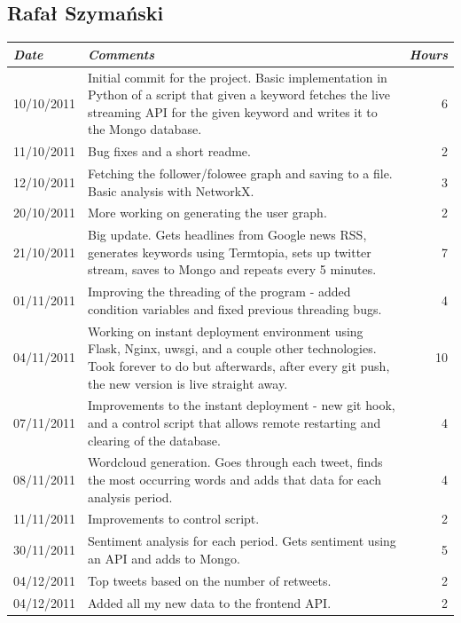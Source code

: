 \documentclass{report}
\begin{document}
		  \subsection{Rafał Szymański}
		    \begin{tabular}{l | p{10cm} r}
		     \emph{\large Date} & \emph{\large Comments} & \emph{\large Hours}\\
		     \hline
		     10/10/2011 & Initial commit for the project. Basic implementation in Python of a script that given a keyword  fetches the live streaming API for the given keyword and writes it to the Mongo database. & 6\\
	       11/10/2011 & Bug fixes and a short readme. & 2\\
	       12/10/2011 & Fetching the follower/folowee graph and saving to a file. Basic analysis with NetworkX. & 3\\
	       20/10/2011 & More working on generating the user graph. & 2\\
	       21/10/2011 & Big update. Gets headlines from Google news RSS, generates keywords using Termtopia, sets up twitter stream, saves to Mongo and repeats every 5 minutes. & 7\\
	       01/11/2011 & Improving the threading of the program - added condition variables and fixed previous threading bugs. & 4\\
	       04/11/2011 & Working on instant deployment environment using Flask, Nginx, uwsgi, and a couple other technologies. Took forever to do but afterwards, after every git push, the new version is live straight away. & 10\\
	       07/11/2011 & Improvements to the instant deployment - new git hook, and a control script that allows remote restarting and clearing of the database. & 4\\
	       08/11/2011 & Wordcloud generation. Goes through each tweet, finds the most occurring words and adds that data for each analysis period. & 4\\
	       11/11/2011 & Improvements to control script. & 2\\
	       30/11/2011 & Sentiment analysis for each period. Gets sentiment using an API and adds to Mongo. & 5\\
	       04/12/2011 & Top tweets based on the number of retweets. & 2\\
	       04/12/2011 & Added all my new data to the frontend API. & 2
		    \end{tabular}
\end{document}
